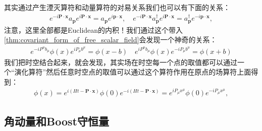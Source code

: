 \bigskip
{}

其实通过产生湮灭算符和动量算符的对易关系我们也可以有下面的关系：
\begin{align}
  e^{-i\mathbf{P}\cdot\mathbf{x}}a_\mathbf{p}e^{i\mathbf{P}\cdot\mathbf{x}}=a_\mathbf{p}e^{i\mathbf{p}\cdot\mathbf{x}},\quad
  e^{-i\mathbf{P}\cdot\mathbf{x}}a_\mathbf{p}^{\dagger}e^{i\mathbf{P}\cdot\mathbf{x}}=a_\mathbf{p}^{\dagger}e^{-i\mathbf{p}\cdot\mathbf{x}},
\end{align}
注意，这里全部都是Euclidean的内积！我们通过这个带入\cref{thm:covariant_form_of_free_scalar_field}会发现一个神奇的关系：
\begin{align}\label{eq:spatial_translation_of_field_operator}
  e^{- iP^\mu b_\mu }\phi(x)e^{iP_\mu b^\mu}=\phi(x-b) \quad    e^{
  iP^\mu b_\mu }\phi(x)e^{-iP_\mu b^\mu}=\phi(x+b)
\end{align}
我们把时空结合起来，就会发现，其实场在时空每一个点的取值都可以通过一个“演化算符”然后任意时空点的取值可以通过这个算符作用在原点的场算符上面得到：
\begin{align}
  \phi(x)=e^{i(Ht-\mathbf{P}\cdot\mathbf{x})}\phi(0)e^{-i(Ht-\mathbf{P}\cdot\mathbf{x})}=e^{iP_\mu
  x^\mu }\phi(0)e^{-iP_\mu x^\mu},
\end{align}

\subsection{角动量和Boost守恒量}\label{sec:Boost生成元(守恒量)}


